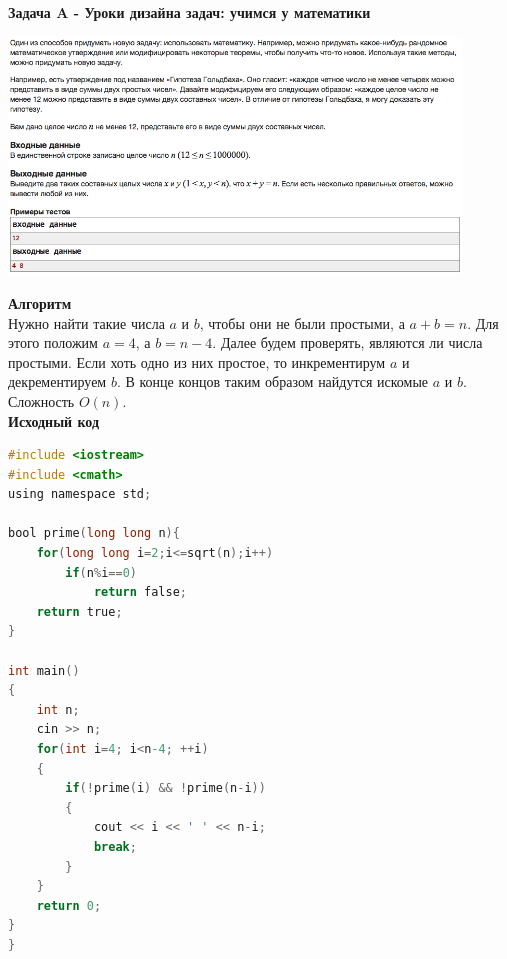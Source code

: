 \documentclass[a4paper,12pt]{article}
\begin{document}
\textbf{{\large Задача A - Уроки дизайна задач: учимся у математики}} \\
\begin{center}
\includegraphics[width=0.9\textwidth]{C_270/C_270_A.png}\\ [1cm]
\end{center}
\textbf{{\large Алгоритм}} \\
Нужно найти такие числа $a$ и $b$, чтобы они не были простыми, а $a + b = n$. Для этого положим $a = 4$, а $b = n - 4$. Далее будем проверять, являются ли числа простыми. Если хоть одно из них простое, то инкрементирум $a$ и декрементируем $b$. В конце концов таким образом найдутся искомые $a$ и $b$. Сложность $O(n)$.\\

\textbf{{\large Исходный код}}
\begin{lstlisting}[language=C]
#include <iostream>
#include <cmath>
using namespace std;

bool prime(long long n){ 
    for(long long i=2;i<=sqrt(n);i++)
        if(n%i==0)
            return false;
    return true;
}

int main()
{
    int n;
    cin >> n;
    for(int i=4; i<n-4; ++i)
    {
        if(!prime(i) && !prime(n-i))
        {
            cout << i << ' ' << n-i;
            break;
        }
    }
    return 0;
}
}\end{lstlisting}
\end{document}
